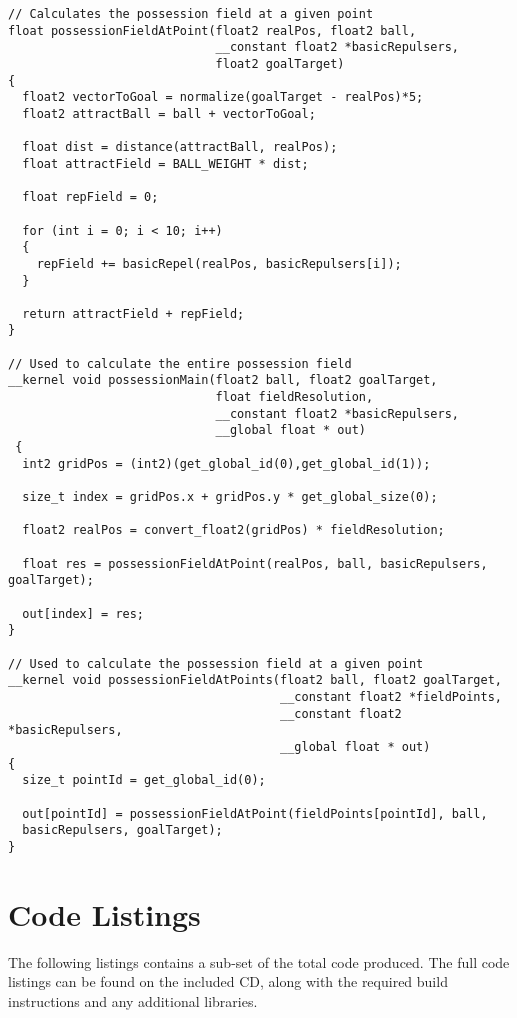 \begin{lstlisting}
// Calculates the possession field at a given point
float possessionFieldAtPoint(float2 realPos, float2 ball, 
                             __constant float2 *basicRepulsers, 
                             float2 goalTarget) 
{
  float2 vectorToGoal = normalize(goalTarget - realPos)*5;
  float2 attractBall = ball + vectorToGoal;

  float dist = distance(attractBall, realPos);
  float attractField = BALL_WEIGHT * dist;

  float repField = 0;

  for (int i = 0; i < 10; i++)
  {
    repField += basicRepel(realPos, basicRepulsers[i]);
  }

  return attractField + repField;
}

// Used to calculate the entire possession field
__kernel void possessionMain(float2 ball, float2 goalTarget, 
                             float fieldResolution, 
                             __constant float2 *basicRepulsers, 
                             __global float * out) 
 { 
  int2 gridPos = (int2)(get_global_id(0),get_global_id(1));

  size_t index = gridPos.x + gridPos.y * get_global_size(0);

  float2 realPos = convert_float2(gridPos) * fieldResolution;

  float res = possessionFieldAtPoint(realPos, ball, basicRepulsers, goalTarget);

  out[index] = res;
}

// Used to calculate the possession field at a given point
__kernel void possessionFieldAtPoints(float2 ball, float2 goalTarget, 
                                      __constant float2 *fieldPoints, 
                                      __constant float2 *basicRepulsers, 
                                      __global float * out) 
{
  size_t pointId = get_global_id(0);

  out[pointId] = possessionFieldAtPoint(fieldPoints[pointId], ball,
  basicRepulsers, goalTarget); 
}
\end{lstlisting}

\section{Code Listings}

The following listings contains a sub-set of the total code produced.  The full
code listings can be found on the included CD, along with the required build
instructions and any additional libraries.

